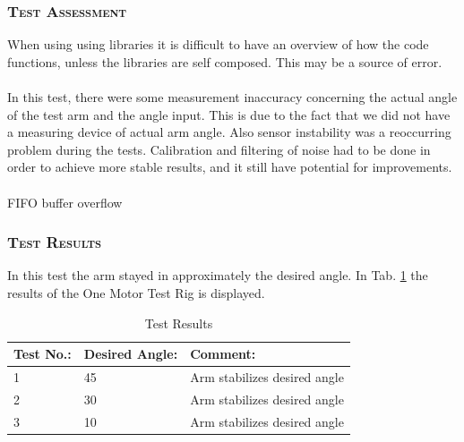 \subsubsection*{\textsc{\medium Test Assessment}}
When using using libraries it is difficult to have an overview of how the code functions, unless the libraries are self composed. This may be a source of error.
\\\\
In this test, there were some measurement inaccuracy concerning the actual angle of the test arm and the angle input. This is due to the fact that we did not have a measuring device of actual arm angle. Also sensor instability was a reoccurring problem during the tests. Calibration and filtering of noise had to be done in order to achieve more stable results, and it still have potential for improvements.
\\\\
FIFO buffer overflow

\subsubsection*{\textsc{\medium Test Results}}
In this test the arm stayed in approximately the desired angle. In Tab. \ref{tab:tab3} the results of the One Motor Test Rig is displayed. 
\begin {table}[H]
    \begin{center}
    \caption {Test Results} 
    \label{tab:tab3} 
    \begin{tabular}{|l|l|l|}\hline 
        Test No.:  & Desired Angle:   & Comment:\\ \hline
        1         & 45    &  Arm stabilizes desired angle  \\ \hline
        2         & 30    &  Arm stabilizes desired angle   \\ \hline
        3         & 10    &  Arm stabilizes desired angle   \\ \hline
    \end{tabular}
    \end{center}
\end{table}
\newpage

